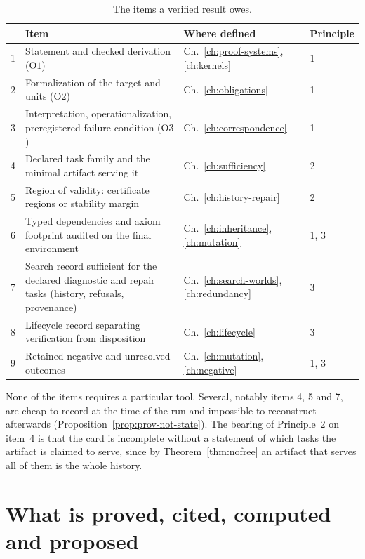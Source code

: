 \begin{table}[ht]
\centering
\small
\begin{tabular}{@{}p{0.5cm}p{5.6cm}p{3.6cm}p{2.5cm}@{}}
\toprule
 & Item & Where defined & Principle\\
\midrule
1 & Statement and checked derivation ($\mathrm{O1}$) & Ch.~\ref{ch:proof-systems}, \ref{ch:kernels} & 1\\
2 & Formalization of the target and units ($\mathrm{O2}$) & Ch.~\ref{ch:obligations} & 1\\
3 & Interpretation, operationalization, preregistered failure condition ($\mathrm{O3}$) & Ch.~\ref{ch:correspondence} & 1\\
4 & Declared task family and the minimal artifact serving it & Ch.~\ref{ch:sufficiency} & 2\\
5 & Region of validity: certificate regions or stability margin & Ch.~\ref{ch:history-repair} & 2\\
6 & Typed dependencies and axiom footprint audited on the final environment & Ch.~\ref{ch:inheritance}, \ref{ch:mutation} & 1, 3\\
7 & Search record sufficient for the declared diagnostic and repair tasks (history, refusals, provenance) & Ch.~\ref{ch:search-worlds}, \ref{ch:redundancy} & 3\\
8 & Lifecycle record separating verification from disposition & Ch.~\ref{ch:lifecycle} & 3\\
9 & Retained negative and unresolved outcomes & Ch.~\ref{ch:mutation}, \ref{ch:negative} & 1, 3\\
\bottomrule
\end{tabular}
\caption{The items a verified result owes.}
\label{tab:card}
\end{table}

None of the items requires a particular tool. Several, notably items 4, 5 and 7, are cheap to record at the time of the run and impossible to reconstruct afterwards (Proposition~\ref{prop:prov-not-state}). The bearing of Principle~2 on item~4 is that the card is incomplete without a statement of which tasks the artifact is claimed to serve, since by Theorem~\ref{thm:nofree} an artifact that serves all of them is the whole history.

\section{What is proved, cited, computed and proposed}

